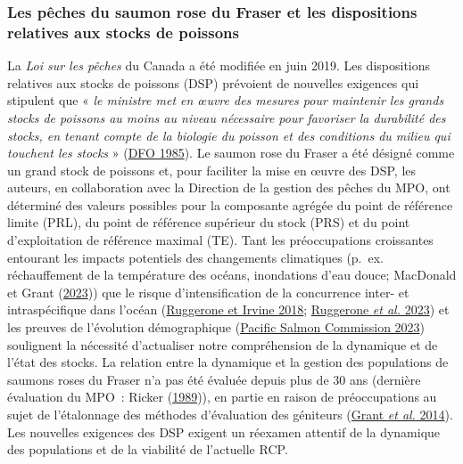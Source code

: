 \documentclass[french,11pt]{book}
\begin{document}
\hypertarget{les-puxeaches-du-saumon-rose-du-fraser-et-les-dispositions-relatives-aux-stocks-de-poissons}{%
\subsubsection{Les pêches du saumon rose du Fraser et les dispositions relatives aux stocks de poissons}\label{les-puxeaches-du-saumon-rose-du-fraser-et-les-dispositions-relatives-aux-stocks-de-poissons}}

La \emph{Loi sur les pêches} du Canada a été modifiée en juin 2019. Les dispositions relatives aux stocks de poissons (DSP) prévoient de nouvelles exigences qui stipulent que « \emph{le ministre met en œuvre des mesures pour maintenir les grands stocks de poissons au moins au niveau nécessaire pour favoriser la durabilité des stocks, en tenant compte de la biologie du poisson et des conditions du milieu qui touchent les stocks} » (\protect\hyperlink{ref-DFO1985Act}{DFO 1985}). Le saumon rose du Fraser a été désigné comme un grand stock de poissons et, pour faciliter la mise en œuvre des DSP, les auteurs, en collaboration avec la Direction de la gestion des pêches du MPO, ont déterminé des valeurs possibles pour la composante agrégée du point de référence limite (PRL), du point de référence supérieur du stock (PRS) et du point d'exploitation de référence maximal (TE). Tant les préoccupations croissantes entourant les impacts potentiels des changements climatiques (p.~ex. réchauffement de la température des océans, inondations d'eau douce; MacDonald et Grant (\protect\hyperlink{ref-macdonaldStateCanadianPacific2023}{2023})) que le risque d'intensification de la concurrence inter- et intraspécifique dans l'océan (\protect\hyperlink{ref-ruggeroneNumbersBiomassNatural2018}{Ruggerone et Irvine 2018}; \protect\hyperlink{ref-ruggeroneDiatomsKillerWhales2023}{Ruggerone \emph{et al.} 2023}) et les preuves de l'évolution démographique (\protect\hyperlink{ref-pacificsalmoncommissionPSCBiologicalData2023}{Pacific Salmon Commission 2023}) soulignent la nécessité d'actualiser notre compréhension de la dynamique et de l'état des stocks. La relation entre la dynamique et la gestion des populations de saumons roses du Fraser n'a pas été évaluée depuis plus de 30 ans (dernière évaluation du MPO~: Ricker (\protect\hyperlink{ref-rickerHistoryPresentState1989}{1989})), en partie en raison de préoccupations au sujet de l'étalonnage des méthodes d'évaluation des géniteurs (\protect\hyperlink{ref-grantFraserRiverPink2014}{Grant \emph{et al.} 2014}). Les nouvelles exigences des DSP exigent un réexamen attentif de la dynamique des populations et de la viabilité de l'actuelle RCP.
\end{document}
